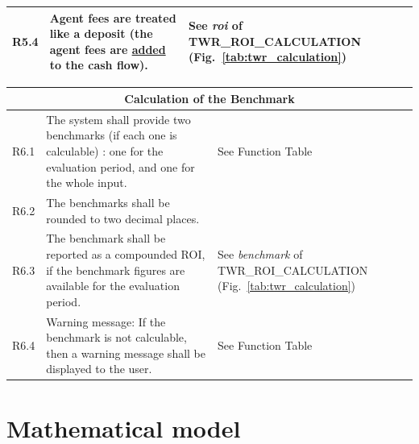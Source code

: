 \documentclass[runningheads,12pt]{article}
\begin{document}
{\begin{longtable}{|l|p{9cm}|p{5cm}|}
\hline
R5.4 & Agent fees are treated like a deposit (the agent fees are \underline{added} to the cash flow). & See \textit{roi} of TWR\_ROI\_CALCULATION (Fig.~\ref{tab:twr_calculation})\\

\hline
\end{longtable}
\centering
\begin{longtable}{|l|p{9cm}|p{5cm}|}

\hline
\multicolumn{3}{|c|}{\textbf{Calculation of the Benchmark}} \\

\hline
R6.1 & The system shall provide two benchmarks (if each one is calculable) : one for the evaluation period, and one for the whole input. & See Function Table\\

\hline
R6.2 &  The benchmarks shall be rounded to two decimal places. & \\

\hline
R6.3 & The benchmark shall be reported as a compounded ROI, if the benchmark figures are available for the evaluation period. & See \textit{benchmark} of TWR\_ROI\_CALCULATION (Fig.~\ref{tab:twr_calculation})\\

\hline
R6.4 & Warning message: If the benchmark is not calculable, then a warning message shall be displayed to the user. & See Function Table\\



\hline
\end{longtable}
}

\newpage

\section{Mathematical model}
\end{document}

